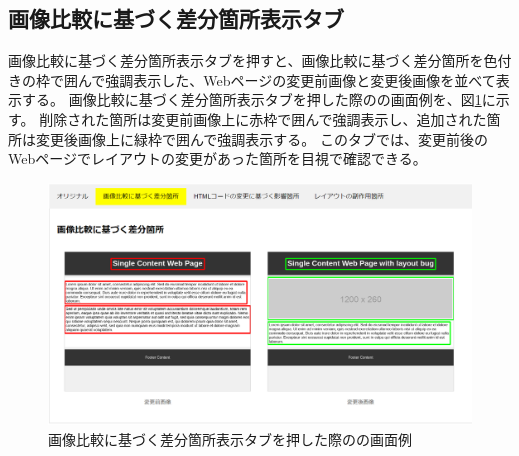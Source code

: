 \subsection{画像比較に基づく差分箇所表示タブ}\label{subsec:images_tab}
画像比較に基づく差分箇所表示タブを押すと、画像比較に基づく差分箇所を色付きの枠で囲んで強調表示した、Webページの変更前画像と変更後画像を並べて表示する。
画像比較に基づく差分箇所表示タブを押した際の\toolName の画面例を、図\ref{fig: Appearance_images_tab}に示す。
削除された箇所は変更前画像上に赤枠で囲んで強調表示し、追加された箇所は変更後画像上に緑枠で囲んで強調表示する。
このタブでは、変更前後のWebページでレイアウトの変更があった箇所を目視で確認できる。
\begin{figure}[tp]
    \begin{center}
        \includegraphics[width=1.0\columnwidth]{image/3_images_tab.png}
        \caption{画像比較に基づく差分箇所表示タブを押した際の\toolName の画面例}
        \label{fig: Appearance_images_tab}
    \end{center}
\end{figure}



